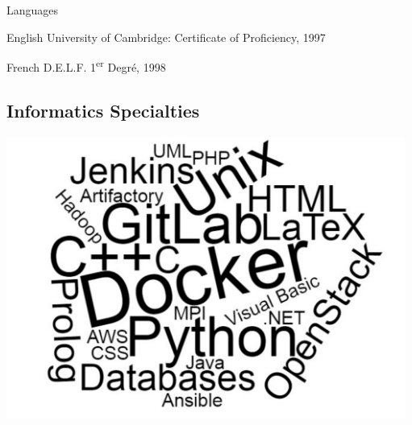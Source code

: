 \documentclass[a4paper]{article}
\begin{document}
\begin{cv}{}
\begin{cvlist}{Languages}
  \item[English] University of Cambridge: Certificate of
                 Proficiency, 1997
  \item[French] D.E.L.F. 1\textsuperscript{er} Degr\'e, 1998
\end{cvlist}

\subsection*{Informatics Specialties}
\begin{center}
  \includegraphics[height=25em]{SkillsCloud}
\end{center}


\end{cv}
\end{document}
